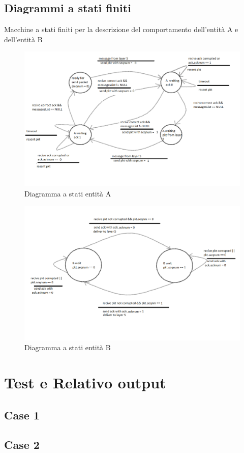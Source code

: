 \documentclass[a4paper]{article}
\begin{document}
\subsection{Diagrammi a stati finiti}
Macchine a stati finiti per la descrizione del comportamento dell'entità A e dell'entità B
\begin{figure}[h!]
\includegraphics[scale = 0.40]{A.png}
\caption{Diagramma a stati entità A}
\end{figure}
\newline
\begin{figure}[h!]
\includegraphics[scale = 0.30]{B.png}
\caption{Diagramma a stati entità B}
\end{figure}
 \newpage

\section{Test e Relativo output}
\subsection{Case 1}

\subsection{Case 2}

\end{document}
